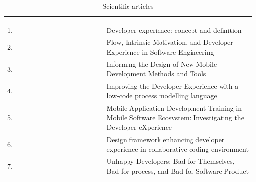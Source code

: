 \documentclass[english, 12pt, a4paper, sci, utf8, a-1b, online]{aaltothesis}
\begin{document}
\begin{center}
  \begin{longtable}{p{0.05\linewidth}p{0.35\linewidth}p{0.6\linewidth}}
    \captionsetup{width=0.6\textwidth}                                                                                                                                                                        \\
    \caption{Scientific articles}                                                                                                                                                                             \\
    \label{table:scientific-articles}                                                                                                                                                                         \\
    1.  & \textcite{fagerholm-dx-concept-and-definition}        & Developer experience: concept and definition                                                                                                \\
    2.  & \textcite{flow-intrinsic-dx}                          & Flow, Intrinsic Motivation, and Developer Experience in Software Engineering                                                                \\
    3.  & \textcite{nebeling2013informing}                      & Informing the Design of New Mobile Development Methods and Tools                                                                            \\
    4.  & \textcite{henriques2018improving}                     & Improving the Developer Experience with a low-code process modelling language                                                               \\
    5.  & \textcite{fontao2018mobile}                           & Mobile Application Development Training in Mobile Software Ecosystem: Investigating the Developer eXperience                                \\
    6.  & \textcite{design-framework-enchancing}                & Design framework enhancing developer experience in collaborative coding environment                                                         \\
    7.  & \textcite{unhappy-developers}                         & Unhappy Developers: Bad for Themselves, Bad for process, and Bad for Software Product                                                       \\

\end{longtable}
\end{center}
\end{document}
